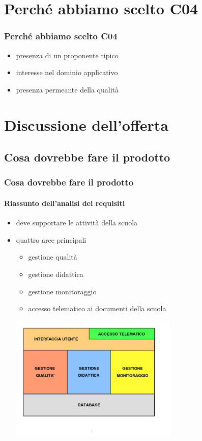 \section{Perché abbiamo scelto C04}

\begin{frame}
  \frametitle{Perché abbiamo scelto C04}
  
\begin{itemize}
\item presenza di un proponente tipico
\item interesse nel dominio applicativo
\item presenza \alert{permeante} della qualità
\end{itemize}

\end{frame}

\section{Discussione dell'offerta}

\subsection{Cosa dovrebbe fare il prodotto}

\begin{frame}
  \frametitle{Cosa dovrebbe fare il prodotto}
  \framesubtitle{Riassunto dell'analisi dei requisiti}
  
\begin{itemize}
\item deve supportare le attività della scuola
\item quattro aree principali

\begin{itemize}
\item gestione qualità
\item gestione didattica
\item gestione monitoraggio
\item accesso telematico ai documenti della scuola
\end{itemize}

\begin{center}
  \includegraphics[width=8cm]{img/Sistema.png}
\end{center}

\end{itemize}

\end{frame}

